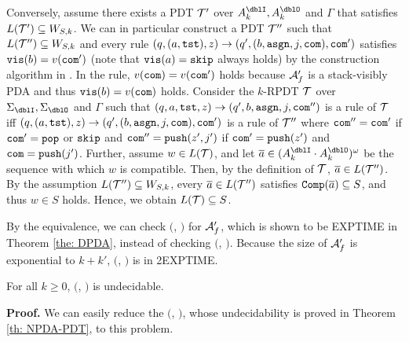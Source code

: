 Conversely, assume there exists a PDT ${\cal T}'$ over $A_k^\dblI,A_k^\dblO$ and $\Gamma$ that
satisfies $L({\cal T}')\subseteq W_{S,k}$.
We can in particular construct a PDT ${\cal T}''$ such that
$L({\cal T}'')\subseteq W_{S,k}$ and
every rule $(q,(a,\mathtt{tst}),z)\to(q',(b,\mathtt{asgn},j,\mathtt{com}),\mathtt{com}')$
satisfies $\mathtt{vis}(b)=v(\mathtt{com}')$
(note that $\mathtt{vis}(a)=\mathtt{skip}$ always holds)
by the construction algorithm in \cite{Wa96}.
In the rule, $v(\mathtt{com})=v(\mathtt{com}')$ holds because ${\cal A}'_f$ is a stack-visibly PDA and thus $\mathtt{vis}(b)=v(\mathtt{com})$ holds.
Consider the $k$-RPDT ${\cal T}$ over $\Sigma_\dblI,\Sigma_\dblO$ and $\Gamma$
such that
$(q,a,\mathtt{tst},z)\to(q',b,\mathtt{asgn},j,\mathtt{com}'')$ is a rule of ${\cal T}$
iff $(q,(a,\mathtt{tst}),z)\to(q',(b,\mathtt{asgn},j,\mathtt{com}),\mathtt{com}')$ is a rule of ${\cal T}''$
where $\mathtt{com}''=\mathtt{com}'$ if $\mathtt{com}'=\mathtt{pop}$ or $\mathtt{skip}$ and
$\mathtt{com}''=\mathtt{push}(z',j')$ if $\mathtt{com}'=\mathtt{push}(z')$ and $\mathtt{com}=\mathtt{push}(j')$.
Further, assume $w\in L({\cal T})$, and let
$\overa\in (A_k^\dblI\cdot A_k^\dblO)^\omega$
be the sequence with which $w$ is compatible.
Then, by the definition of ${\cal T}$,
${\overline{a}}\in L({\cal T}'')$.
By the assumption $L({\cal T}'')\subseteq W_{S,k}$,
every ${\overline{a}}\in L({\cal T}'')$
satisfies ${\mathtt{Comp}}({\overline{a}})\subseteq S$, and thus $w\in S$ holds.
Hence, we obtain $L({\cal T})\subseteq S$.

By the equivalence, we can check \Real $($\DPDA, \PDT$)$ for ${\cal A}'_f$,
which is shown to be EXPTIME in Theorem \ref{the: DPDA}, instead of checking \Real $($\DRPDAv, \RPDTk$)$.
Because the size of ${\cal A}'_f$ is exponential to $k+k'$,
\Real $($\DRPDAv, \RPDTk$)$ is in 2EXPTIME.

\begin{theorem}
For all $k\geq 0$, \Real $($\NRPDA, \RPDTk$)$ is undecidable.
\end{theorem}
{\bf Proof.}\quad
We can easily reduce the \Real $($\NPDA, \PDT$)$,
whose undecidability is proved in Theorem \ref{th: NPDA-PDT}, to this problem.


